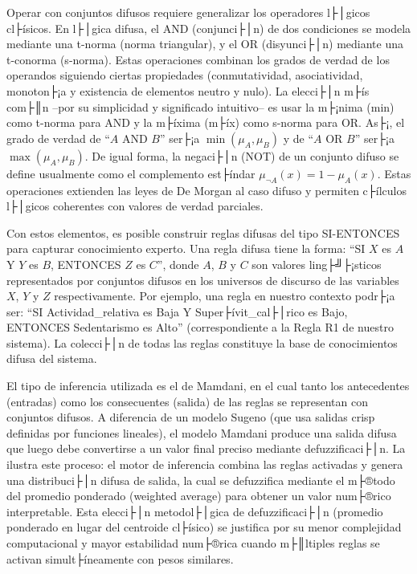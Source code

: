 Operar con conjuntos difusos requiere generalizar los operadores l├│gicos cl├ísicos. En l├│gica difusa, el AND (conjunci├│n) de dos condiciones se modela mediante una t-norma (norma triangular), y el OR (disyunci├│n) mediante una t-conorma (s-norma). Estas operaciones combinan los grados de verdad de los operandos siguiendo ciertas propiedades (conmutatividad, asociatividad, monoton├¡a y existencia de elementos neutro y nulo). La elecci├│n m├ís com├║n --por su simplicidad y significado intuitivo-- es usar la m├¡nima (min) como t-norma para AND y la m├íxima (m├íx) como s-norma para OR. As├¡, el grado de verdad de ``$A$ AND $B$'' ser├¡a $\min(\mu_A, \mu_B)$ y de ``$A$ OR $B$'' ser├¡a $\max(\mu_A, \mu_B)$. De igual forma, la negaci├│n (NOT) de un conjunto difuso se define usualmente como el complemento est├índar $\mu_{\neg A}(x) = 1 - \mu_A(x)$. Estas operaciones extienden las leyes de De Morgan al caso difuso y permiten c├ílculos l├│gicos coherentes con valores de verdad parciales.

Con estos elementos, es posible construir reglas difusas del tipo SI-ENTONCES para capturar conocimiento experto. Una regla difusa tiene la forma: ``SI $X$ es $A$ Y $Y$ es $B$, ENTONCES $Z$ es $C$'', donde $A$, $B$ y $C$ son valores ling├╝├¡sticos representados por conjuntos difusos en los universos de discurso de las variables $X$, $Y$ y $Z$ respectivamente. Por ejemplo, una regla en nuestro contexto podr├¡a ser: ``SI Actividad\_relativa es Baja Y Super├ívit\_cal├│rico es Bajo, ENTONCES Sedentarismo es Alto'' (correspondiente a la Regla R1 de nuestro sistema). La colecci├│n de todas las reglas constituye la base de conocimientos difusa del sistema. 

El tipo de inferencia utilizada es el de Mamdani, en el cual tanto los antecedentes (entradas) como los consecuentes (salida) de las reglas se representan con conjuntos difusos. A diferencia de un modelo Sugeno (que usa salidas crisp definidas por funciones lineales), el modelo Mamdani produce una salida difusa que luego debe convertirse a un valor final preciso mediante defuzzificaci├│n. La  ilustra este proceso: el motor de inferencia combina las reglas activadas y genera una distribuci├│n difusa de salida, la cual se defuzzifica mediante el m├®todo del promedio ponderado (weighted average) para obtener un valor num├®rico interpretable. Esta elecci├│n metodol├│gica de defuzzificaci├│n (promedio ponderado en lugar del centroide cl├ísico) se justifica por su menor complejidad computacional y mayor estabilidad num├®rica cuando m├║ltiples reglas se activan simult├íneamente con pesos similares.

